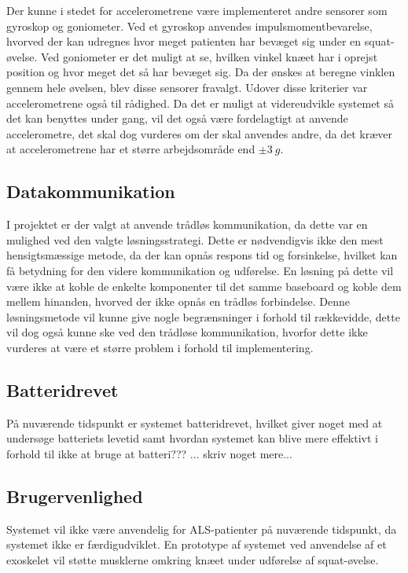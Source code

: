 Der kunne i stedet for accelerometrene være implementeret andre sensorer som gyroskop og goniometer. Ved et gyroskop anvendes impulsmomentbevarelse, hvorved der kan udregnes hvor meget patienten har bevæget sig under en squat-øvelse. Ved goniometer er det muligt at se, hvilken vinkel knæet har i oprejst position og hvor meget det så har bevæget sig. Da der ønskes at beregne vinklen gennem hele øvelsen, blev disse sensorer fravalgt. Udover disse kriterier  var accelerometrene også til rådighed. Da det er muligt at videreudvikle systemet så det kan benyttes under gang, vil det også være fordelagtigt at anvende accelerometre, det skal dog vurderes om der skal anvendes andre, da det kræver at accelerometrene har et større arbejdsområde end $\pm3~g$.

\subsection{Datakommunikation}
I projektet er der valgt at anvende trådløs kommunikation, da dette var en mulighed ved den valgte løsningsstrategi. Dette er nødvendigvis ikke den mest hensigtsmæssige metode, da der kan opnås respons tid og forsinkelse, hvilket kan få betydning for den videre kommunikation og udførelse. En løsning på dette vil være ikke at koble de enkelte komponenter til det samme baseboard og koble dem mellem hinanden, hvorved der ikke opnås en trådløs forbindelse. Denne løsningsmetode vil kunne give nogle begrænsninger i forhold til rækkevidde, dette vil dog også kunne ske ved den trådløse kommunikation, hvorfor dette ikke vurderes at være et større problem i forhold til implementering. 


\subsection{Batteridrevet}
På nuværende tidspunkt er systemet batteridrevet, hvilket giver noget med at undersøge batteriets levetid samt hvordan systemet kan blive mere effektivt i forhold til ikke at bruge at batteri???
... skriv noget mere...

\subsection{Brugervenlighed}
Systemet vil ikke være anvendelig for ALS-patienter på nuværende tidspunkt, da systemet ikke er færdigudviklet. En prototype af systemet ved anvendelse af et exoskelet vil støtte musklerne omkring knæet under udførelse af squat-øvelse. 


